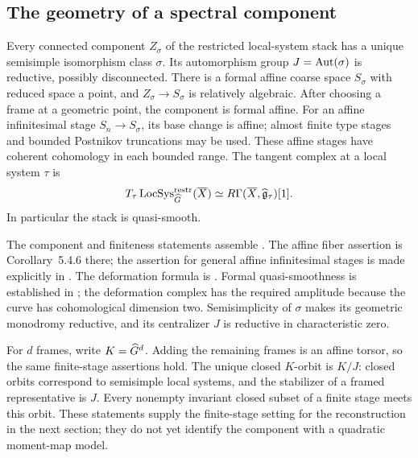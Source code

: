 \subsection{The geometry of a spectral component}

\begin{theorem}\label{inp:components}
Every connected component $Z_\sigma$ of the restricted local-system
stack has a unique semisimple isomorphism class $\sigma$.  Its
automorphism group $J=\operatorname{Aut}(\sigma)$ is reductive, possibly disconnected.
There is a formal affine coarse space $S_\sigma$ with reduced space a
point, and $Z_\sigma\to S_\sigma$ is relatively algebraic.
After choosing a frame at a geometric point, the component is formal
affine.  For an affine infinitesimal stage $S_n\to S_\sigma$, its
base change is affine; almost finite type stages and bounded Postnikov
truncations may be used.  These affine stages have coherent cohomology
in each bounded range.  The tangent complex at a local system $\tau$ is
\begin{equation}\label{inp:tangent}
 T_\tau\operatorname{LocSys}^{\mathrm{restr}}_{\widehat G}(\overline X)
       \simeq R\Gamma(\overline X,\widehat{\mathfrak g}_\tau)[1].
\end{equation}
In particular the stack is quasi-smooth.
\end{theorem}

The component and finiteness statements assemble
\cite[Theorems~1.4.5 and~1.6.3, Remarks~1.4.6--1.4.7,
Corollary~3.7.4, and Theorem~5.4.2]{AGKRRV1}.
The affine fiber assertion is Corollary~5.4.6 there; the assertion for
general affine infinitesimal stages is made explicitly in
\cite[\S7.9.10]{AGKRRV1}.
The deformation formula is \cite[Proposition~2.2.2 and
\S\S2.4,~25.4.3]{AGKRRV1}.
Formal quasi-smoothness is established in
\cite[\S\S21.2.1--21.2.3]{AGKRRV1}; the deformation complex has the
required amplitude because the curve has cohomological dimension two.
Semisimplicity of $\sigma$ makes its geometric monodromy
reductive, and its centralizer $J$ is reductive in characteristic zero.

For $d$ frames, write $K=\widehat G^d$.  Adding the remaining frames is an
affine torsor, so the same finite-stage assertions hold.  The unique
closed $K$-orbit is $K/J$: closed orbits correspond to semisimple local
systems, and the stabilizer of a framed representative is $J$.
Every nonempty invariant closed subset of a finite stage meets this
orbit.  These statements supply the finite-stage setting for the
reconstruction in the next section; they do not yet identify the
component with a quadratic moment-map model.

